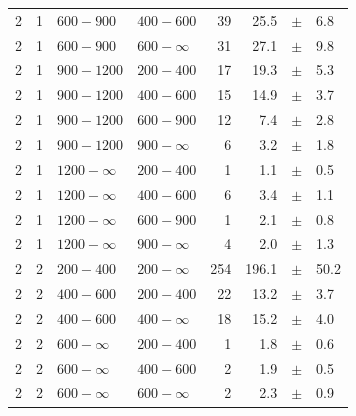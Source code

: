 \begin{table}[!h]
\begin{tabular}{rrllrrcl}
2 & 1 & $ 600- 900$ & $400-600$ &     39 &     25.5 &$\pm$&    6.8 \\
2 & 1 & $ 600- 900$ & $600-\infty$ &     31 &     27.1 &$\pm$&    9.8 \\
2\T & 1 & $ 900-1200$ & $200-400$ &     17 &     19.3 &$\pm$&    5.3 \\
2 & 1 & $ 900-1200$ & $400-600$ &     15 &     14.9 &$\pm$&    3.7 \\
2 & 1 & $ 900-1200$ & $600-900$ &     12 &      7.4 &$\pm$&    2.8 \\
2 & 1 & $ 900-1200$ & $900-\infty$ &      6 &      3.2 &$\pm$&    1.8 \\
2\T & 1 & $1200- \infty$ & $200-400$ &      1 &      1.1 &$\pm$&    0.5 \\
2 & 1 & $1200- \infty$ & $400-600$ &      6 &      3.4 &$\pm$&    1.1 \\
2 & 1 & $1200- \infty$ & $600-900$ &      1 &      2.1 &$\pm$&    0.8 \\
2 & 1 & $1200- \infty$ & $900-\infty$ &      4 &      2.0 &$\pm$&    1.3 \\
2\T & 2 & $ 200- 400$ & $200-\infty$ &    254 &    196.1 &$\pm$&   50.2 \\
2\T & 2 & $ 400- 600$ & $200-400$ &     22 &     13.2 &$\pm$&    3.7 \\
2 & 2 & $ 400- 600$ & $400-\infty$ &     18 &     15.2 &$\pm$&    4.0 \\
2\T & 2 & $ 600- \infty$ & $200-400$ &      1 &      1.8 &$\pm$&    0.6 \\
2 & 2 & $ 600- \infty$ & $400-600$ &      2 &      1.9 &$\pm$&    0.5 \\
2 & 2 & $ 600- \infty$ & $600-\infty$ &      2 &      2.3 &$\pm$&    0.9 \\
    \hline
  \end{tabular}
\end{table}

